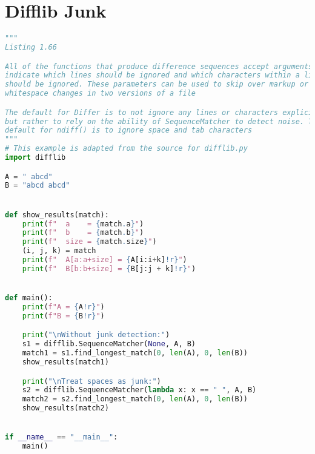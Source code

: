\documentclass[a4paper,landscape]{report}
\begin{document}
\section{Difflib Junk}
\begin{lstlisting}[language=Python]
"""
Listing 1.66

All of the functions that produce difference sequences accept arguments to
indicate which lines should be ignored and which characters within a line
should be ignored. These parameters can be used to skip over markup or
whitespace changes in two versions of a file

The default for Differ is to not ignore any lines or characters explicitly,
but rather to rely on the ability of SequenceMatcher to detect noise. The
default for ndiff() is to ignore space and tab characters
"""
# This example is adapted from the source for difflib.py
import difflib

A = " abcd"
B = "abcd abcd"


def show_results(match):
    print(f"  a    = {match.a}")
    print(f"  b    = {match.b}")
    print(f"  size = {match.size}")
    (i, j, k) = match
    print(f"  A[a:a+size] = {A[i:i+k]!r}")
    print(f"  B[b:b+size] = {B[j:j + k]!r}")


def main():
    print(f"A = {A!r}")
    print(f"B = {B!r}")

    print("\nWithout junk detection:")
    s1 = difflib.SequenceMatcher(None, A, B)
    match1 = s1.find_longest_match(0, len(A), 0, len(B))
    show_results(match1)

    print("\nTreat spaces as junk:")
    s2 = difflib.SequenceMatcher(lambda x: x == " ", A, B)
    match2 = s2.find_longest_match(0, len(A), 0, len(B))
    show_results(match2)


if __name__ == "__main__":
    main()

\end{lstlisting}
\end{document}

